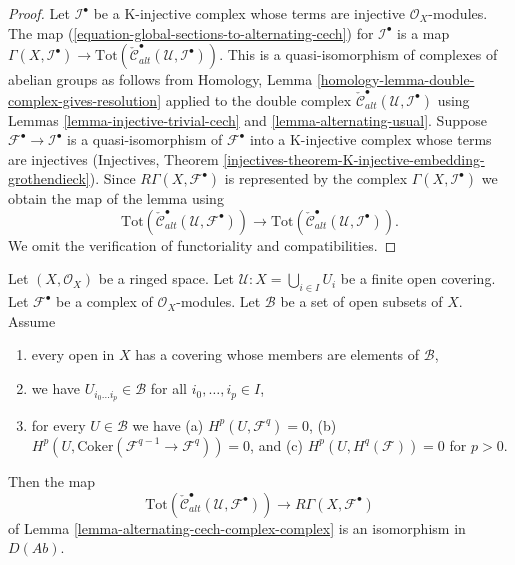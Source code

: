 \begin{proof}
Let ${\mathcal I}^\bullet$ be a K-injective complex whose terms
are injective $\mathcal{O}_X$-modules.
The map (\ref{equation-global-sections-to-alternating-cech}) for
$\mathcal{I}^\bullet$ is a map
$\Gamma(X, {\mathcal I}^\bullet) \to
\text{Tot}(\check{\mathcal{C}}^\bullet_{alt}({\mathcal U},
{\mathcal I}^\bullet))$.
This is a quasi-isomorphism of complexes of abelian groups
as follows from
Homology, Lemma \ref{homology-lemma-double-complex-gives-resolution}
applied to the double complex
$\check{\mathcal{C}}^\bullet_{alt}({\mathcal U},
{\mathcal I}^\bullet)$ using
Lemmas \ref{lemma-injective-trivial-cech} and \ref{lemma-alternating-usual}.
Suppose ${\mathcal F}^\bullet \to {\mathcal I}^\bullet$ is a quasi-isomorphism
of ${\mathcal F}^\bullet$ into a K-injective complex whose terms
are injectives (Injectives, Theorem
\ref{injectives-theorem-K-injective-embedding-grothendieck}).
Since $R\Gamma(X, {\mathcal F}^\bullet)$ is represented by the complex
$\Gamma(X, {\mathcal I}^\bullet)$ we obtain the map of the lemma
using
$$
\text{Tot}(\check{\mathcal{C}}^\bullet_{alt}({\mathcal U},
{\mathcal F}^\bullet))
\longrightarrow
\text{Tot}(\check{\mathcal{C}}^\bullet_{alt}({\mathcal U},
{\mathcal I}^\bullet)).
$$
We omit the verification of functoriality and compatibilities.
\end{proof}

\begin{lemma}
\label{lemma-alternating-cech-complex-complex-ss}
Let $(X, \mathcal{O}_X)$ be a ringed space. Let
$\mathcal{U} : X = \bigcup_{i \in I} U_i$ be a finite open covering. Let
$\mathcal{F}^\bullet$ be a complex of $\mathcal{O}_X$-modules.
Let $\mathcal{B}$ be a set of open subsets of $X$. Assume
\begin{enumerate}
\item every open in $X$ has a covering whose members are
elements of $\mathcal{B}$,
\item we have $U_{i_0\ldots i_p} \in \mathcal{B}$ for all
$i_0, \ldots, i_p \in I$,
\item for every $U \in \mathcal{B}$ we have
(a) $H^p(U, \mathcal{F}^q) = 0$,
(b) $H^p(U, \text{Coker}(\mathcal{F}^{q - 1} \to \mathcal{F}^q)) = 0$, and
(c) $H^p(U, H^q(\mathcal{F})) = 0$ for $p > 0$.
\end{enumerate}
Then the map
$$
\text{Tot}(\check{\mathcal{C}}^\bullet_{alt}(\mathcal{U}, \mathcal{F}^\bullet))
\longrightarrow
R\Gamma(X, \mathcal{F}^\bullet)
$$
of Lemma \ref{lemma-alternating-cech-complex-complex}
is an isomorphism in $D(\textit{Ab})$.
\end{lemma}

